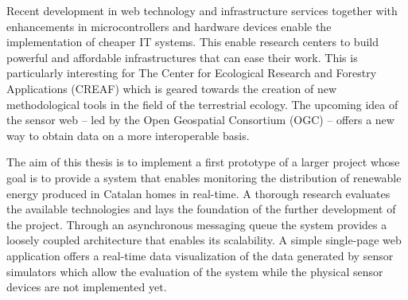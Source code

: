 % 
% 
%

Recent development in web technology and infrastructure services together with enhancements in microcontrollers and hardware devices enable the implementation of cheaper IT systems. This enable research centers to build powerful and affordable infrastructures that can ease their work. This is particularly interesting for The Center for Ecological Research and Forestry Applications (CREAF) which is geared towards the creation of new methodological tools in the field of the terrestrial ecology. The upcoming idea of the sensor web -- led by the Open Geospatial Consortium (OGC) -- offers a new way to obtain data on a more interoperable basis.

The aim of this thesis is to implement a first prototype of a larger project whose goal is to provide a system that enables monitoring the distribution of renewable energy produced in Catalan homes in real-time. A thorough research evaluates the available technologies and lays the foundation of the further development of the project. Through an asynchronous messaging queue the system provides a loosely coupled architecture that enables its scalability. A simple single-page web application offers a real-time data visualization of the data generated by sensor simulators which allow the evaluation of the system while the physical sensor devices are not implemented yet.
